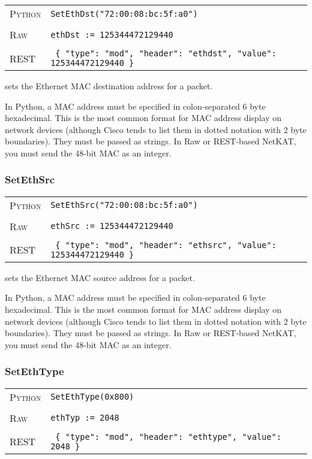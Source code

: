 \bigskip
\begin{tabularx}{\linewidth}{lX}
\textsc{Python}   & \texttt{SetEthDst("72:00:08:bc:5f:a0")} \\ \\
\textsc{Raw}    & \texttt{ethDst := 125344472129440}     \\ \\
\textsc{REST} & \texttt{ \{ "type": "mod", "header": "ethdst", "value": 125344472129440 \} }
\end{tabularx}

 sets the Ethernet MAC destination address for a packet.    

In Python, a MAC address must be specified in colon-separated 6 byte hexadecimal.  This is the most common format
for MAC address display on network devices (although Cisco tends to list them in dotted notation with 2 byte
boundaries).  They must be passed as strings.  In Raw or REST-based NetKAT, you must send the 48-bit MAC as 
an integer.  

\subsubsection{SetEthSrc}

\bigskip
\begin{tabularx}{\linewidth}{lX}
\textsc{Python}   & \texttt{SetEthSrc("72:00:08:bc:5f:a0")} \\ \\
\textsc{Raw}    & \texttt{ethSrc := 125344472129440}     \\ \\
\textsc{REST} & \texttt{ \{ "type": "mod", "header": "ethsrc", "value": 125344472129440 \} }
\end{tabularx}

 sets the Ethernet MAC source address for a packet.    

In Python, a MAC address must be specified in colon-separated 6 byte hexadecimal.  This is the most common format
for MAC address display on network devices (although Cisco tends to list them in dotted notation with 2 byte
boundaries).  They must be passed as strings.  In Raw or REST-based NetKAT, you must send the 48-bit MAC as 
an integer.  

\subsubsection{SetEthType}

\bigskip
\begin{tabularx}{\linewidth}{lX}
\textsc{Python}   & \texttt{SetEthType(0x800)} \\ \\
\textsc{Raw}    & \texttt{ethTyp := 2048}     \\ \\
\textsc{REST} & \texttt{ \{ "type": "mod", "header": "ethtype", "value": 2048 \} }
\end{tabularx}

